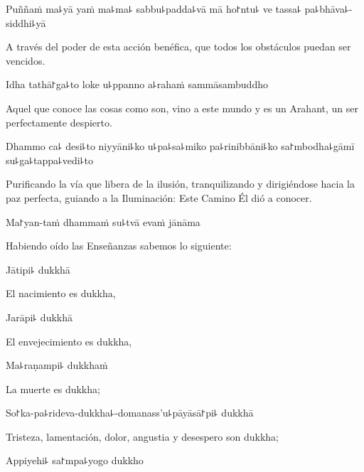 Puññaṁ ma꜕yā yaṁ ma꜕ma꜕ sabbu꜕padda꜕vā mā ho꜓ntu꜕ ve tassa꜕ pa꜕bhāva꜕-siddhi꜕yā

\begin{english}
  A través del poder de esta acción benéfica, que todos los obstáculos puedan ser vencidos.
\end{english}

Idha tathā꜓ga꜕to loke u꜕ppanno a꜕rahaṁ sammāsambuddho

\begin{english}
  Aquel que conoce las cosas como son, vino a este mundo y es un Arahant, un ser perfectamente despierto.
\end{english}

Dhammo ca꜕ desi꜕to niyyāni꜕ko u꜕pa꜕sa꜕miko pa꜕rinibbāni꜕ko sa꜓mbodha꜕gāmī su꜕ga꜕tappa꜕vedi꜕to

\enlargethispage{\baselineskip}

\begin{english}
  Purificando la vía que libera de la ilusión, tranquilizando y dirigiéndose hacia la paz perfecta, guiando a la Iluminación: Este Camino Él dió a conocer.
\end{english}

Ma꜓yan-taṁ dhammaṁ su꜕tvā evaṁ jānāma

\begin{english}
  Habiendo oído las Enseñanzas sabemos lo siguiente:
\end{english}

Jātipi꜕ dukkhā

\begin{english}
  El nacimiento es dukkha,
\end{english}

Jarāpi꜕ dukkhā

\begin{english}
  El envejecimiento es dukkha,
\end{english}

Ma꜕raṇampi꜕ dukkhaṁ

\begin{english}
  La muerte es dukkha;
\end{english}

So꜓ka-pa꜕rideva-dukkha꜕-domanass'u꜕pāyāsā꜓pi꜕ dukkhā

\begin{english}
  Tristeza, lamentación, dolor, angustia y desespero son dukkha;
\end{english}

Appiyehi꜕ sa꜓mpa꜕yogo dukkho

